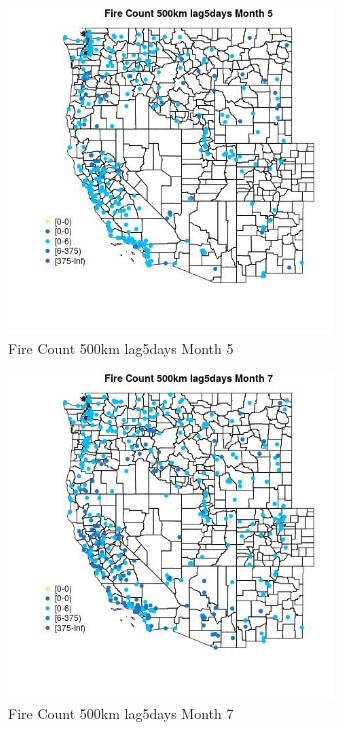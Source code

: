 \begin{figure} 
\centering  
\includegraphics[width=0.77\textwidth]{Code_Outputs/Report_ML_input_PM25_Step4_part_e_de_duplicated_aves_compiled_2019-05-18wNAs_MapObsMo5Fire_Count_500km_lag5days.jpg} 
\caption{\label{fig:Report_ML_input_PM25_Step4_part_e_de_duplicated_aves_compiled_2019-05-18wNAsMapObsMo5Fire_Count_500km_lag5days}Fire Count 500km lag5days Month 5} 
\end{figure} 
 

\begin{figure} 
\centering  
\includegraphics[width=0.77\textwidth]{Code_Outputs/Report_ML_input_PM25_Step4_part_e_de_duplicated_aves_compiled_2019-05-18wNAs_MapObsMo7Fire_Count_500km_lag5days.jpg} 
\caption{\label{fig:Report_ML_input_PM25_Step4_part_e_de_duplicated_aves_compiled_2019-05-18wNAsMapObsMo7Fire_Count_500km_lag5days}Fire Count 500km lag5days Month 7} 
\end{figure} 
 

